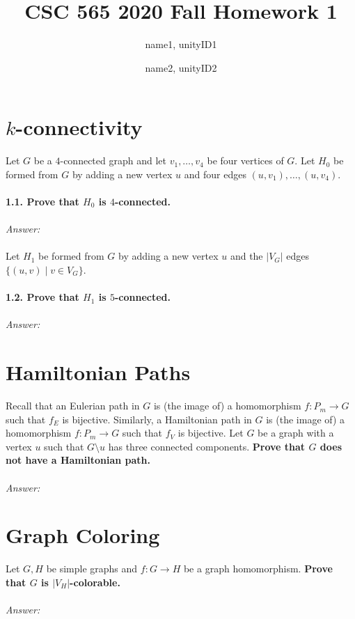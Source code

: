 \documentclass{article}
\title{CSC 565 2020 Fall Homework 1}
\author{    
    name1, unityID1 \\
    \and
    name2, unityID2 
}
\begin{document}
  \maketitle

  \section{$k$-connectivity}
    Let $G$ be a $4$-connected graph and let $v_1,\ldots, v_4$ be four vertices of $G$.
    Let $H_0$ be formed from $G$ by adding a new vertex $u$ and four edges $(u,v_1), \ldots , (u,v_4)$.
    \\\\
    \textbf{1.1. Prove that $H_0$ is $4$-connected.}
    \\\\
    \textit{Answer:}
    \\\\
    
    Let $H_1$ be formed from $G$ by adding a new vertex $u$ and the $|V_G|$ edges $\{(u,v) \mid v\in V_G\}$.
    \\\\
    \textbf{1.2. Prove that $H_1$ is $5$-connected.}
    \\\\
    \textit{Answer:}
    

  \section{Hamiltonian Paths}
  Recall that an Eulerian path in $G$ is (the image of) a homomorphism $f:P_m\to G$ such that $f_E$ is bijective.
  Similarly, a Hamiltonian path in $G$ is (the image of) a homomorphism $f:P_m\to G$ such that $f_V$ is bijective.
  Let $G$ be a graph with a vertex $u$ such that $G\setminus u$ has three connected components.
  \textbf{Prove that $G$ does not have a Hamiltonian path.}
  \\\\
  \textit{Answer:}
    
  \section{Graph Coloring}
    Let $G, H$ be simple graphs and $f:G\to H$ be a graph homomorphism.
    \textbf{Prove that $G$ is $|V_H|$-colorable.}
  \\\\
  \textit{Answer:}
    

    
\end{document}
